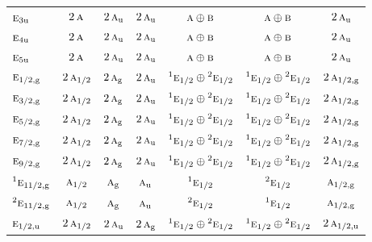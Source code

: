 \documentclass[10pt,a4paper]{article}
\numberwithin{equation}{section}
\newcommand{\irr}[1]{\text{\normalfont\scshape #1}}
\newcommand{\conjpair}[1]{{}^{#1}}
\newcommand{\ptag}[1]{\mathrm{#1}}
\begin{document}
{\begin{longtable}{@{}lcccccc@{}}
$\irr{e}_{3\ptag{u}}$ & $2\,\irr{a}$ & $2\,\irr{a}_{\ptag{u}}$ & $2\,\irr{a}_{\ptag{u}}$ & $\irr{a}\oplus \irr{b}$ & $\irr{a}\oplus \irr{b}$ & $2\,\irr{a}_{\ptag{u}}$\\
$\irr{e}_{4\ptag{u}}$ & $2\,\irr{a}$ & $2\,\irr{a}_{\ptag{u}}$ & $2\,\irr{a}_{\ptag{u}}$ & $\irr{a}\oplus \irr{b}$ & $\irr{a}\oplus \irr{b}$ & $2\,\irr{a}_{\ptag{u}}$\\
$\irr{e}_{5\ptag{u}}$ & $2\,\irr{a}$ & $2\,\irr{a}_{\ptag{u}}$ & $2\,\irr{a}_{\ptag{u}}$ & $\irr{a}\oplus \irr{b}$ & $\irr{a}\oplus \irr{b}$ & $2\,\irr{a}_{\ptag{u}}$\\
$\irr{e}_{1/2,\ptag{g}}$ & $2\,\irr{a}_{1/2}$ & $2\,\irr{a}_{\ptag{g}}$ & $2\,\irr{a}_{\ptag{u}}$ & $\conjpair{1}\irr{e}_{1/2}\oplus \conjpair{2}\irr{e}_{1/2}$ & $\conjpair{1}\irr{e}_{1/2}\oplus \conjpair{2}\irr{e}_{1/2}$ & $2\,\irr{a}_{1/2,\ptag{g}}$\\
$\irr{e}_{3/2,\ptag{g}}$ & $2\,\irr{a}_{1/2}$ & $2\,\irr{a}_{\ptag{g}}$ & $2\,\irr{a}_{\ptag{u}}$ & $\conjpair{1}\irr{e}_{1/2}\oplus \conjpair{2}\irr{e}_{1/2}$ & $\conjpair{1}\irr{e}_{1/2}\oplus \conjpair{2}\irr{e}_{1/2}$ & $2\,\irr{a}_{1/2,\ptag{g}}$\\
$\irr{e}_{5/2,\ptag{g}}$ & $2\,\irr{a}_{1/2}$ & $2\,\irr{a}_{\ptag{g}}$ & $2\,\irr{a}_{\ptag{u}}$ & $\conjpair{1}\irr{e}_{1/2}\oplus \conjpair{2}\irr{e}_{1/2}$ & $\conjpair{1}\irr{e}_{1/2}\oplus \conjpair{2}\irr{e}_{1/2}$ & $2\,\irr{a}_{1/2,\ptag{g}}$\\
$\irr{e}_{7/2,\ptag{g}}$ & $2\,\irr{a}_{1/2}$ & $2\,\irr{a}_{\ptag{g}}$ & $2\,\irr{a}_{\ptag{u}}$ & $\conjpair{1}\irr{e}_{1/2}\oplus \conjpair{2}\irr{e}_{1/2}$ & $\conjpair{1}\irr{e}_{1/2}\oplus \conjpair{2}\irr{e}_{1/2}$ & $2\,\irr{a}_{1/2,\ptag{g}}$\\
$\irr{e}_{9/2,\ptag{g}}$ & $2\,\irr{a}_{1/2}$ & $2\,\irr{a}_{\ptag{g}}$ & $2\,\irr{a}_{\ptag{u}}$ & $\conjpair{1}\irr{e}_{1/2}\oplus \conjpair{2}\irr{e}_{1/2}$ & $\conjpair{1}\irr{e}_{1/2}\oplus \conjpair{2}\irr{e}_{1/2}$ & $2\,\irr{a}_{1/2,\ptag{g}}$\\
$\conjpair{1}\irr{e}_{11/2,\ptag{g}}$ & $\irr{a}_{1/2}$ & $\irr{a}_{\ptag{g}}$ & $\irr{a}_{\ptag{u}}$ & $\conjpair{1}\irr{e}_{1/2}$ & $\conjpair{2}\irr{e}_{1/2}$ & $\irr{a}_{1/2,\ptag{g}}$\\
$\conjpair{2}\irr{e}_{11/2,\ptag{g}}$ & $\irr{a}_{1/2}$ & $\irr{a}_{\ptag{g}}$ & $\irr{a}_{\ptag{u}}$ & $\conjpair{2}\irr{e}_{1/2}$ & $\conjpair{1}\irr{e}_{1/2}$ & $\irr{a}_{1/2,\ptag{g}}$\\
$\irr{e}_{1/2,\ptag{u}}$ & $2\,\irr{a}_{1/2}$ & $2\,\irr{a}_{\ptag{u}}$ & $2\,\irr{a}_{\ptag{g}}$ & $\conjpair{1}\irr{e}_{1/2}\oplus \conjpair{2}\irr{e}_{1/2}$ & $\conjpair{1}\irr{e}_{1/2}\oplus \conjpair{2}\irr{e}_{1/2}$ & $2\,\irr{a}_{1/2,\ptag{u}}$\\

\end{longtable}}
\end{document}
